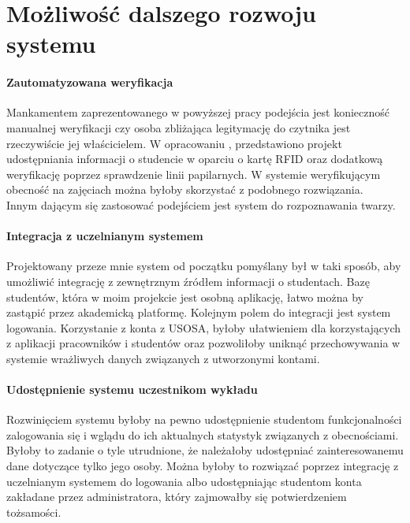 \documentclass[declaration,shortabstract, mgr]{iithesis}
\begin{document}
\chapter{Możliwość dalszego rozwoju systemu}
\subsubsection{Zautomatyzowana weryfikacja}
\indent Mankamentem zaprezentowanego w powyższej pracy podejścia jest konieczność manualnej weryfikacji czy osoba zbliżająca legitymację do czytnika jest rzeczywiście jej właścicielem. W opracowaniu \cite{fingerprint}, przedstawiono projekt udostępniania informacji o studencie w oparciu o kartę RFID oraz dodatkową weryfikację poprzez sprawdzenie linii papilarnych. W systemie weryfikującym obecność na zajęciach można byłoby skorzystać z podobnego rozwiązania.\\
\indent Innym dającym się zastosować podejściem jest system do rozpoznawania twarzy.
\subsubsection{Integracja z uczelnianym systemem}
\indent Projektowany przeze mnie system od początku pomyślany był w taki sposób, aby umożliwić integrację z zewnętrznym źródłem informacji o studentach. Bazę studentów, która w moim projekcie jest osobną aplikację, łatwo można by zastąpić przez akademicką platformę. Kolejnym polem do integracji jest system logowania. Korzystanie z konta z USOSA, byłoby ułatwieniem dla korzystających z aplikacji pracowników i studentów oraz pozwoliłoby uniknąć przechowywania w systemie wrażliwych danych związanych z utworzonymi kontami.
\subsubsection{Udostępnienie systemu uczestnikom wykładu}
\indent Rozwinięciem systemu byłoby na pewno udostępnienie studentom funkcjonalności zalogowania się i wglądu do ich aktualnych statystyk związanych z obecnościami. Byłoby to zadanie o tyle utrudnione, że należałoby udostępniać zainteresowanemu dane dotyczące tylko jego osoby. Można byłoby to rozwiązać poprzez integrację z uczelnianym systemem do logowania albo udostępniając studentom konta zakładane przez administratora, który zajmowałby się potwierdzeniem tożsamości.
\end{document}
